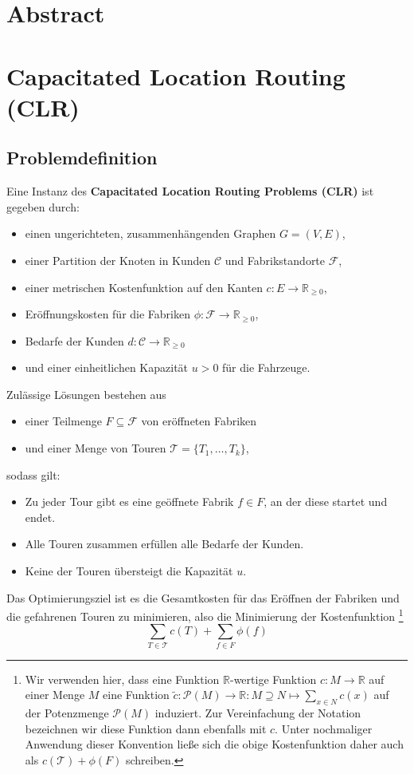 \documentclass[a4paper,ngerman,12pt,bibtotoc]{scrartcl}
\theoremstyle{definition}
\theoremstyle{plain}
\theoremstyle{remark}
\newcommand{\IR}{\mathbb{R}}
\newcommand{\Tc}{\mathcal{T}}
\newcommand{\ClientSet}{\mathscr{C}}
\newcommand{\FacilitySet}{\mathscr{F}}
\begin{document}

	
\section*{\glqq Abstract\grqq}



\section{Capacitated Location Routing (CLR)}

	\subsection{Problemdefinition}

Eine Instanz des \textbf{Capacitated Location Routing Problems (CLR)} ist gegeben durch:
\begin{itemize}
	\item einen ungerichteten, zusammenhängenden Graphen $G =(V,E)$,
	\item einer Partition der Knoten in Kunden $\ClientSet$ und Fabrikstandorte $\FacilitySet$,
	\item einer metrischen Kostenfunktion auf den Kanten $c: E \to \IR_{\geq 0}$,
	\item Eröffnungskosten für die Fabriken $\phi: \FacilitySet \to \IR_{\geq 0}$,
	\item Bedarfe der Kunden $d: \ClientSet \to \IR_{\geq 0}$
	\item und einer einheitlichen Kapazität $u > 0$ für die Fahrzeuge.		
\end{itemize}
Zulässige Lösungen bestehen aus
\begin{itemize}
	\item einer Teilmenge $F \subseteq \FacilitySet$ von eröffneten Fabriken
	\item und einer Menge von Touren $\Tc = \{T_1, \dots, T_k\}$,
\end{itemize}
sodass gilt:
\begin{itemize}
	\item Zu jeder Tour gibt es eine geöffnete Fabrik $f \in F$, an der diese startet und endet.
	\item Alle Touren zusammen erfüllen alle Bedarfe der Kunden.
	\item Keine der Touren übersteigt die Kapazität $u$.
\end{itemize}
Das Optimierungsziel ist es die Gesamtkosten für das Eröffnen der Fabriken und die gefahrenen Touren zu minimieren, also die Minimierung der Kostenfunktion
\footnote{Wir verwenden hier, dass eine Funktion $\IR$-wertige Funktion $c: M \to \IR$ auf einer Menge $M$ eine Funktion $\tilde{c}: \mathcal{P}(M) \to \IR: M \supseteq N \mapsto \sum_{x \in N} c(x)$ auf der Potenzmenge $\mathcal{P}(M)$ induziert. Zur Vereinfachung der Notation bezeichnen wir diese Funktion dann ebenfalls mit $c$. Unter nochmaliger Anwendung dieser Konvention ließe sich die obige Kostenfunktion daher auch als $c(\Tc) + \phi(F)$ schreiben.}
	\[\sum_{T\in\Tc} c(T) + \sum_{f\in F}\phi(f) \]
	
\end{document}
